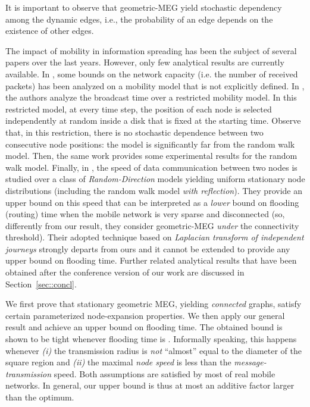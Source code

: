 \documentclass[10pt,a4paper]{article}
\begin{document}
\noindent It is important to observe that geometric-MEG yield stochastic dependency among the dynamic edges, i.e., the probability of an edge depends on the existence of other edges.

\noindent The impact of mobility in information spreading has been the subject of several papers over the last years.
However, only few analytical results are currently available. In \cite{GT02}, some bounds on the network capacity (i.e. the number of received packets) has been analyzed on a mobility model that is not explicitly defined. In \cite{KY08}, the authors analyze the broadcast time over a restricted mobility model. In this restricted model, at every time step, the position of each  node is selected independently at random inside a disk that is fixed at the starting time. Observe that, in this restriction, there is no stochastic dependence between two consecutive node positions: the model is significantly far from the random walk model. Then, the same work provides some experimental results for the random walk model. Finally, in \cite{JMR09}, the speed of data communication between two nodes is studied over a class of \emph{Random-Direction} models yielding uniform stationary node distributions (including the random walk model \emph{with reflection}). They provide an upper bound on this speed that can be interpreted as a   \emph{lower} bound on flooding (routing) time when the mobile  network is very sparse and disconnected (so, differently from our result, they consider geometric-MEG \emph{under} the connectivity threshold). Their adopted technique based on \emph{Laplacian transform of independent journeys} strongly departs from ours and it cannot be extended to provide any upper bound on flooding time. Further related analytical results that have been obtained after the conference version of our work are discussed in Section~\ref{sec::concl}.


\noindent We first prove that stationary geometric MEG, yielding \emph{connected} graphs, satisfy certain parameterized node-expansion properties. We then apply our general result and achieve an upper bound on flooding time. The obtained bound is shown to be tight whenever flooding time is . Informally speaking, this happens whenever \emph{(i)} the transmission radius is \emph{not} ``almost'' equal to the diameter of the square region and \emph{(ii)} the maximal \emph{node speed} is less than the \emph{message-transmission} speed. Both assumptions are satisfied by most of real mobile networks. In general, our upper bound is thus at most an  additive factor larger than the optimum.
\end{document}
